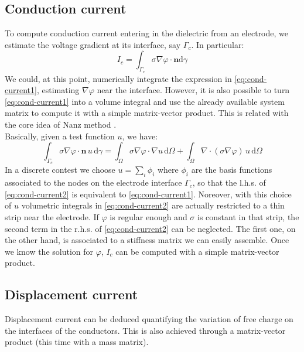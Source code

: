 \documentclass[11pt,a4paper]{article}
\begin{document}
\subsection{Conduction current}
To compute conduction current entering in the dielectric from an electrode, we estimate the voltage gradient at its interface, say \(\Gamma_{c}\). In particular:
\begin{equation}\label{eq:cond-current1}
	I_c = \int_{\Gamma_{c}} \sigma \nabla \varphi \cdot \mathbf{n} \mathrm{d}\gamma
\end{equation}
We could, at this point, numerically integrate the expression in \eqref{eq:cond-current1}, estimating \(\nabla\varphi\) near the interface. However, it is also possible to turn \eqref{eq:cond-current1} into a volume integral and use the already available system matrix to compute it with a simple matrix-vector product. This is related with the core idea of Nanz method \cite{Nanz}.\\
Basically, given a test function \(u\), we have:
\begin{equation}\label{eq:cond-current2}
	\int_{\Gamma_{c}} \sigma \nabla \varphi \cdot \mathbf{n}\, u\, \mathrm{d}\gamma =
	\int_{\Omega} \sigma \nabla \varphi \cdot \nabla u\,\mathrm{d}\Omega +
	\int_{\Omega} \nabla \cdot \left( \sigma \nabla \varphi \right)\,u\,\mathrm{d}\Omega
\end{equation}
In a discrete contest we choose \(u = \sum_i \phi_i\) where \(\phi_i\) are the basis functions associated to the nodes on the electrode interface \(\Gamma_c\), so that the l.h.s. of \eqref{eq:cond-current2} is equivalent to \eqref{eq:cond-current1}. Noreover, with this choice of \(u\) volumetric integrals in \eqref{eq:cond-current2} are actually restricted to a thin strip near the electrode. If \(\varphi\) is regular enough and \(\sigma\) is constant in that strip, the second term in the r.h.s. of \eqref{eq:cond-current2} can be neglected. The first one, on the other hand, is associated to a stiffness matrix we can easily assemble. Once we know the solution for \(\varphi\), \(I_c\) can be computed with a simple matrix-vector product.
\subsection{Displacement current}
Displacement current can be deduced quantifying the variation of free charge on the interfaces of the conductors. This is also achieved through a matrix-vector product (this time with a mass matrix).
\end{document}
